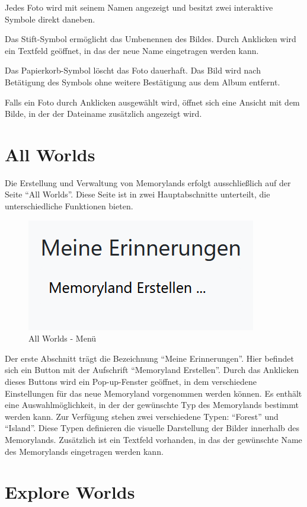 Jedes Foto wird mit seinem Namen angezeigt und besitzt zwei interaktive Symbole direkt 
daneben.

Das Stift-Symbol ermöglicht das Umbenennen des Bildes. Durch Anklicken wird ein Textfeld 
geöffnet, in das der neue Name eingetragen werden kann.

Das Papierkorb-Symbol löscht das Foto dauerhaft. Das Bild wird nach Betätigung des Symbols 
ohne weitere Bestätigung aus dem Album entfernt.

Falls ein Foto durch Anklicken ausgewählt wird, öffnet sich eine Ansicht mit dem Bilde, 
in der der Dateiname zusätzlich angezeigt wird. 

\section{All Worlds}

Die Erstellung und Verwaltung von Memorylands erfolgt ausschlie\ss{}lich auf der Seite 
``All Worlds''. Diese Seite ist in zwei Hauptabschnitte unterteilt, die 
unterschiedliche Funktionen bieten.

\begin{figure}
    \centering
    \includegraphics[scale=0.4]{pics/all_worlds_teil1.PNG}
    \caption{All Worlds - Menü}
    \label{fig:all-worlds-menu}
\end{figure}

Der erste Abschnitt trägt die Bezeichnung ``Meine Erinnerungen''. Hier befindet 
sich ein Button mit der Aufschrift ``Memoryland Erstellen''. Durch das Anklicken 
dieses Buttons wird ein Pop-up-Fenster geöffnet, in dem verschiedene Einstellungen 
für das neue Memoryland vorgenommen werden können. Es enthält eine Auswahlmöglichkeit, 
in der der gewünschte Typ des Memorylands bestimmt werden kann. Zur Verfügung stehen 
zwei verschiedene Typen: ``Forest'' und ``Island''. Diese Typen definieren die 
visuelle Darstellung der Bilder innerhalb des Memorylands. Zusätzlich ist ein 
Textfeld vorhanden, in das der gewünschte Name des Memorylands eingetragen werden 
kann.



\section{Explore Worlds}

